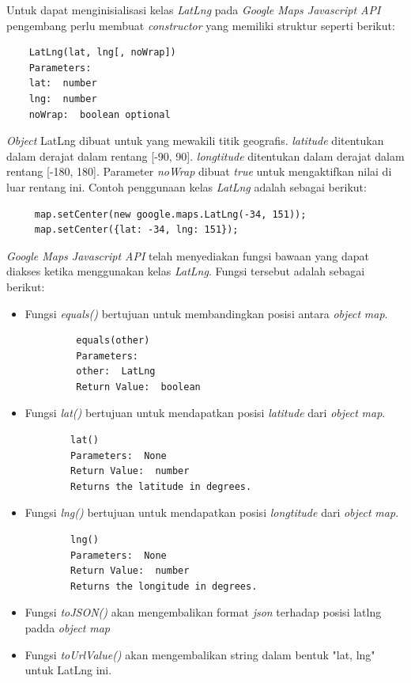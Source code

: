 Untuk dapat menginisialisasi kelas \textit{LatLng} pada \textit{Google Maps Javascript API} pengembang perlu membuat \textit{constructor} yang memiliki struktur seperti berikut:
\begin{lstlisting}
    LatLng(lat, lng[, noWrap])
    Parameters: 
    lat:  number
    lng:  number
    noWrap:  boolean optional
\end{lstlisting}
\textit{Object} LatLng dibuat untuk yang mewakili titik geografis. \textit{latitude} ditentukan dalam derajat dalam rentang [-90, 90]. \textit{longtitude} ditentukan dalam derajat dalam rentang [-180, 180]. Parameter \textit{noWrap} dibuat \textit{true}  untuk mengaktifkan nilai di luar rentang ini. Contoh penggunaan kelas \textit{LatLng} adalah sebagai berikut:
\begin{lstlisting}
     map.setCenter(new google.maps.LatLng(-34, 151));
     map.setCenter({lat: -34, lng: 151}); 
\end{lstlisting}
\textit{Google Maps Javascript API} telah menyediakan fungsi bawaan yang dapat diakses ketika menggunakan kelas \textit{LatLng}. Fungsi tersebut adalah sebagai berikut:
\begin{itemize}
    \item Fungsi \textit{equals()} bertujuan untuk membandingkan posisi antara \textit{object} \textit{map}.
    \begin{lstlisting}
         equals(other)
         Parameters: 
         other:  LatLng
         Return Value:  boolean
    \end{lstlisting}
    \item Fungsi \textit{lat()} bertujuan untuk mendapatkan posisi \textit{latitude} dari  \textit{object} \textit{map}.
    \begin{lstlisting}
        lat()
        Parameters:  None
        Return Value:  number
        Returns the latitude in degrees.
    \end{lstlisting}
    \item Fungsi \textit{lng()} bertujuan untuk mendapatkan posisi \textit{longtitude} dari  \textit{object} \textit{map}.
    \begin{lstlisting}
        lng()
        Parameters:  None
        Return Value:  number
        Returns the longitude in degrees.
    \end{lstlisting}
    \item Fungsi \textit{toJSON()} akan mengembalikan format \textit{json} terhadap posisi latlng padda \textit{object} \textit{map}
    \item Fungsi \textit{toUrlValue()} akan mengembalikan string dalam bentuk "lat, lng" untuk LatLng ini.
\end{itemize}


